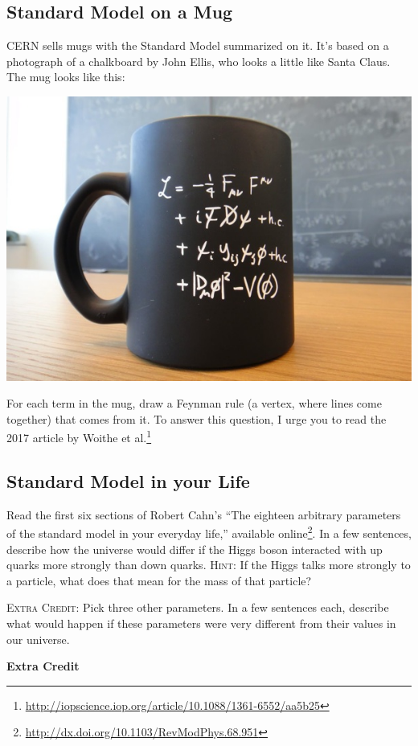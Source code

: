 \documentclass[12pt]{article}
\begin{document}
\subsection{Standard Model on a Mug}

CERN sells mugs with the Standard Model summarized on it. It's based on a photograph of a chalkboard by John Ellis, who looks a little like Santa Claus. The mug looks like this:
\begin{center}
\includegraphics[width=.35\textwidth]{HW8bbb.jpg}	
\end{center}
For each term in the mug, draw a Feynman rule (a vertex, where lines come together) that comes from it. To answer this question, I urge you to read the 2017 article by Woithe et al.\footnote{\url{http://iopscience.iop.org/article/10.1088/1361-6552/aa5b25}} 




\subsection{Standard Model in your Life}

Read the first six sections of Robert Cahn's ``The eighteen arbitrary parameters of the standard model in your everyday life,'' available online\footnote{\url{http://dx.doi.org/10.1103/RevModPhys.68.951}}. In a few sentences, describe how the universe would differ if the Higgs boson interacted with up quarks more strongly than down quarks. \textsc{Hint}: If the Higgs talks more strongly to a particle, what does that mean for the mass of that particle?

\textsc{Extra Credit}: Pick three other parameters. In a few sentences each, describe what would happen if these parameters were very different from their values in our universe.





\appendix
\vspace{1em}
{\Large\textbf{Extra Credit}}
\end{document}
